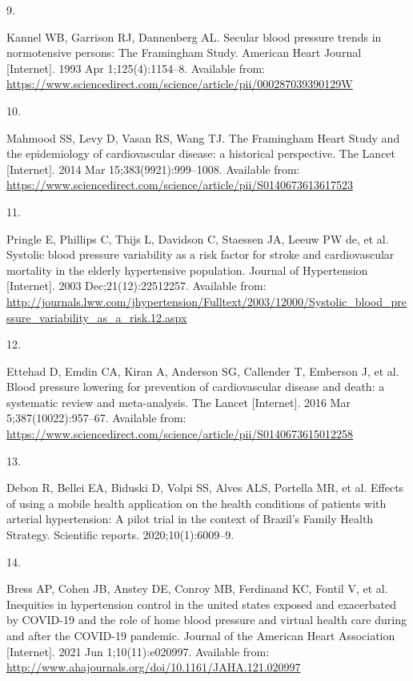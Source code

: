 \documentclass[
]{article}
\newlength{\cslhangindent}
\newlength{\csllabelwidth}
\newlength{\cslentryspacingunit} %
\newenvironment{CSLReferences}[2] %
 {%
  \setlength{\parindent}{0pt}
  \ifodd #1
  \let\oldpar\par
  \def\par{\hangindent=\cslhangindent\oldpar}
  \fi
  \setlength{\parskip}{#2\cslentryspacingunit}
 }%
 {}
\newcommand{\CSLLeftMargin}[1]{\parbox[t]{\csllabelwidth}{#1}}
\newcommand{\CSLRightInline}[1]{\parbox[t]{\linewidth - \csllabelwidth}{#1}\break}
\begin{document}
\begin{CSLReferences}{0}{0}
\leavevmode{}%
\CSLLeftMargin{9. }%
\CSLRightInline{Kannel WB, Garrison RJ, Dannenberg AL. Secular blood
pressure trends in normotensive persons: The Framingham Study. American
Heart Journal {[}Internet{]}. 1993 Apr 1;125(4):1154--8. Available from:
\url{https://www.sciencedirect.com/science/article/pii/000287039390129W}}

\leavevmode{}%
\CSLLeftMargin{10. }%
\CSLRightInline{Mahmood SS, Levy D, Vasan RS, Wang TJ. The Framingham
Heart Study and the epidemiology of cardiovascular disease: a historical
perspective. The Lancet {[}Internet{]}. 2014 Mar 15;383(9921):999--1008.
Available from:
\url{https://www.sciencedirect.com/science/article/pii/S0140673613617523}}

\leavevmode{}%
\CSLLeftMargin{11. }%
\CSLRightInline{Pringle E, Phillips C, Thijs L, Davidson C, Staessen JA,
Leeuw PW de, et al. Systolic blood pressure variability as a risk factor
for stroke and cardiovascular mortality in the elderly hypertensive
population. Journal of Hypertension {[}Internet{]}. 2003
Dec;21(12):22512257. Available from:
\url{http://journals.lww.com/jhypertension/Fulltext/2003/12000/Systolic_blood_pressure_variability_as_a_risk.12.aspx}}

\leavevmode{}%
\CSLLeftMargin{12. }%
\CSLRightInline{Ettehad D, Emdin CA, Kiran A, Anderson SG, Callender T,
Emberson J, et al. Blood pressure lowering for prevention of
cardiovascular disease and death: a systematic review and meta-analysis.
The Lancet {[}Internet{]}. 2016 Mar 5;387(10022):957--67. Available
from:
\url{https://www.sciencedirect.com/science/article/pii/S0140673615012258}}

\leavevmode{}%
\CSLLeftMargin{13. }%
\CSLRightInline{Debon R, Bellei EA, Biduski D, Volpi SS, Alves ALS,
Portella MR, et al. Effects of using a mobile health application on the
health conditions of patients with arterial hypertension: A pilot trial
in the context of Brazil's Family Health Strategy. Scientific reports.
2020;10(1):6009--9. }

\leavevmode{}%
\CSLLeftMargin{14. }%
\CSLRightInline{Bress AP, Cohen JB, Anstey DE, Conroy MB, Ferdinand KC,
Fontil V, et al. Inequities in hypertension control in the united states
exposed and exacerbated by COVID{-}19 and the role of home blood
pressure and virtual health care during and after the COVID{-}19
pandemic. Journal of the American Heart Association {[}Internet{]}. 2021
Jun 1;10(11):e020997. Available from:
\url{http://www.ahajournals.org/doi/10.1161/JAHA.121.020997}}


\end{CSLReferences}
\end{document}

